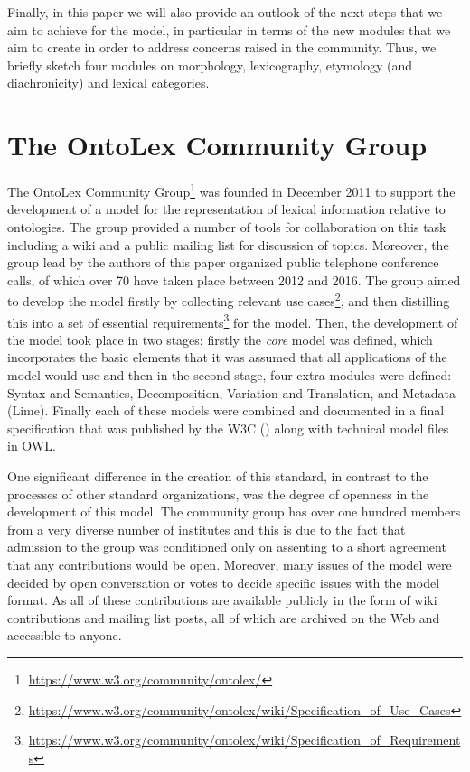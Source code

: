 \documentclass[12pt,a4paper]{elex2017}
\begin{document}
Finally, in this paper we will also provide an outlook of the next steps that we
aim to achieve for the model, in particular in terms of the new modules that we
aim to create in order to address concerns raised in the community.
Thus, we briefly sketch four modules on morphology, lexicography,
etymology (and diachronicity) and lexical categories.

\section{The OntoLex Community Group}

The OntoLex Community
Group\footnote{\url{https://www.w3.org/community/ontolex/}}  was founded in
December 2011 to support the development of a model for the representation of
lexical information relative to ontologies. The group provided a number of tools
for collaboration on this task including a wiki and a public mailing list for
discussion of topics. Moreover, the group lead by the authors of this paper
organized public telephone conference calls, of which over 70 have taken place
between 2012 and 2016. The group aimed to develop the model firstly by
collecting relevant use
cases\footnote{\url{https://www.w3.org/community/ontolex/wiki/Specification_of_Use_Cases}},
and then distilling this into a set of essential
requirements\footnote{\url{https://www.w3.org/community/ontolex/wiki/Specification_of_Requirements}}
for the model. Then, the development of the model took place in two stages:
firstly the \emph{core} model was defined, which incorporates the basic elements
that it was assumed that all applications of the model would use and then in the
second stage, four extra modules were defined: Syntax and Semantics,
Decomposition, Variation and Translation, and Metadata (Lime).
Finally each of these models were combined and documented in a final
specification that was published by the W3C (\cite{cimiano2016lexicon}) along with
technical model files in OWL.

One significant difference in the creation of this standard, in contrast to the
processes of other standard organizations, was the degree of openness in the
development of this model. The community group has over one hundred members from a
very diverse number of institutes and this is due to the fact that admission to
the group was conditioned only on assenting to a short agreement that
any contributions would be open. Moreover, many issues of the model were
decided by open conversation or votes to decide specific issues with the model
format. As all of these contributions are available publicly in the form of wiki
contributions and mailing list posts, all of which are archived on the Web and
accessible to anyone. 
\end{document}
